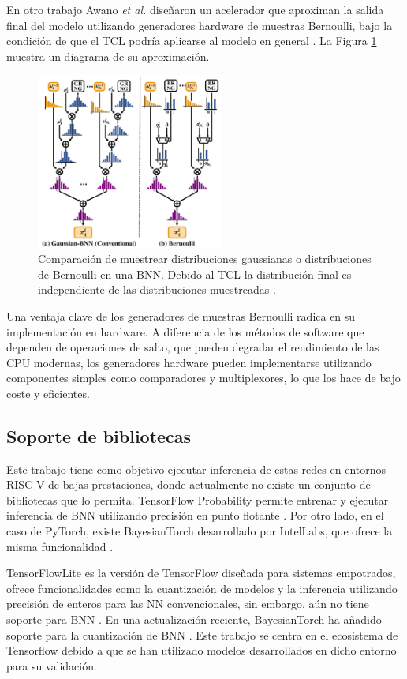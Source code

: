 En otro trabajo Awano \emph{et al.} diseñaron un acelerador que aproximan la salida final del modelo utilizando generadores hardware de muestras Bernoulli, bajo la condición de que el TCL podría aplicarse al modelo en general \cite{bnn_clt_approx}. La Figura \ref{fig:b2n2_clt} muestra un diagrama de su aproximación.

\begin{figure}[h]
	\centering
	\includegraphics[width=0.55\textwidth]{root/Imagenes/estado_del_arte/b2n2_clt.png}
	\caption{Comparación de muestrear distribuciones gaussianas o distribuciones de Bernoulli en una BNN. Debido al TCL la distribución final es independiente de las distribuciones muestreadas \cite{bnn_clt_approx}.}
	\label{fig:b2n2_clt}
\end{figure}

Una ventaja clave de los generadores de muestras Bernoulli radica en su implementación en hardware. A diferencia de los métodos de software que dependen de operaciones de salto, que pueden degradar el rendimiento de las CPU modernas, los generadores hardware pueden implementarse utilizando componentes simples como comparadores y multiplexores, lo que los hace de bajo coste y eficientes.

\subsection{Soporte de bibliotecas}

Este trabajo tiene como objetivo ejecutar inferencia de estas redes en entornos RISC-V de bajas prestaciones, donde actualmente no existe un conjunto de bibliotecas que lo permita. TensorFlow Probability permite entrenar y ejecutar inferencia de BNN utilizando precisión en punto flotante \cite{tfprob}. Por otro lado, en el caso de PyTorch, existe BayesianTorch desarrollado por IntelLabs, que ofrece la misma funcionalidad \cite{bayesian_torch}.

TensorFlowLite  es la versión de TensorFlow diseñada para sistemas empotrados, ofrece funcionalidades como la cuantización de modelos y la inferencia utilizando precisión de enteros para las NN convencionales, sin embargo, aún no tiene soporte para BNN \cite{tflite}. En una actualización reciente, BayesianTorch ha añadido soporte para la cuantización de BNN \cite{bnn_quant}. Este trabajo se centra en el ecosistema de Tensorflow debido a que se han utilizado modelos desarrollados en dicho entorno para su validación.
